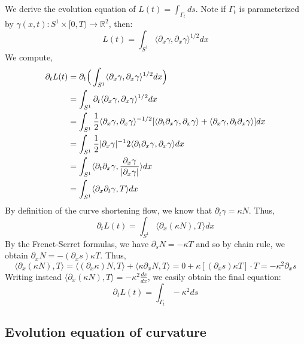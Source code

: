 \documentclass{article}
\begin{document}
We derive the evolution equation of  $L(t) = \int_{\Gamma_t} ds$. Note if $\Gamma_t$ is parameterized by $\gamma(x,t): S^1 \times [0,T) \to \mathbb{R}^2$, then:
\[ L(t) = \int_{S^1} \langle \partial_x \gamma, \partial_x \gamma\rangle^{1/2}dx \]
We compute,
\begin{align*}
	\partial_t L(t) &= \partial_t \Big{(} \int_{S^1} \langle \partial_x \gamma, \partial_x \gamma\rangle^{1/2}dx \Big{)} \\
		&= \int_{S^1} \partial_t \langle \partial_x \gamma, \partial_x \gamma\rangle^{1/2}dx \\
		&= \int_{S^1} \frac{1}{2}\langle \partial_x \gamma, \partial_x \gamma\rangle^{-1/2} 
			[\langle \partial_t \partial_x \gamma, \partial_x \gamma\rangle + \langle \partial_x \gamma, \partial_t \partial_x \gamma\rangle] dx \\
		&= \int_{S^1} \frac{1}{2}|\partial_x \gamma|^{-1} 2\langle \partial_t \partial_x \gamma, \partial_x \gamma\rangle dx \\
		&= \int_{S^1} \langle \partial_t \partial_x \gamma, \frac{\partial_x \gamma}{|\partial_x \gamma|}\rangle dx \\
		&= \int_{S^1} \langle \partial_x \partial_t \gamma, T\rangle dx
\end{align*}
By definition of the curve shortening flow, we know that $\partial_t \gamma = \kappa N$. Thus,
\[ \partial_t L(t) = \int_{S^1} \langle \partial_x (\kappa N), T\rangle dx \]
By the Frenet-Serret formulas, we have $\partial_s N = -\kappa T$ and so by chain rule, we obtain $\partial_x N = -(\partial_x s)\kappa T$. Thus,
\[ \langle \partial_x (\kappa N), T\rangle = \langle (\partial_x \kappa)N, T\rangle + \langle \kappa \partial_x N, T\rangle = 0 + \kappa [(\partial_x s)\kappa T]\cdot T = -\kappa^2 \partial_x s \]
Writing instead $\langle \partial_x (\kappa N),T\rangle = -\kappa^2 \frac{ds}{dx}$, we easily obtain the final equation:
\[ \partial_t L(t) = \int_{\Gamma_t} -\kappa^2 ds \]

\subsection{Evolution equation of curvature}
\end{document}
